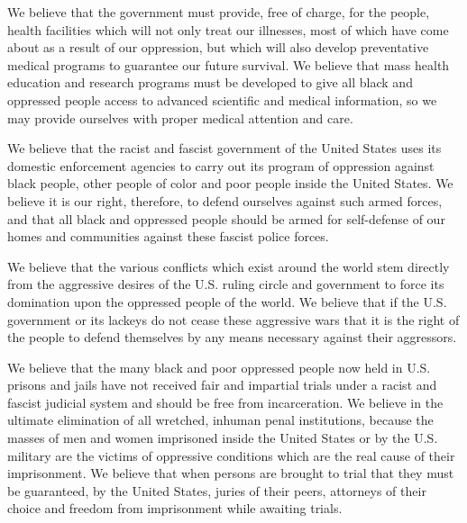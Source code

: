 \documentclass[14pt]{extarticle}
\begin{document}
 We believe that the government must provide, free of charge, for the people, health facilities which will not only treat our illnesses, most of which have come about as a result of our oppression, but which will also develop preventative medical programs to guarantee our future survival. We believe that mass health education and research programs must be developed to give all black and oppressed people access to advanced scientific and medical information, so we may provide ourselves with proper medical attention and care.

 We believe that the racist and fascist government of the United States uses its domestic enforcement agencies to carry out its program of oppression against black people, other people of color and poor people inside the United States. We believe it is our right, therefore, to defend ourselves against such armed forces, and that all black and oppressed people should be armed for self-defense of our homes and communities against these fascist police forces.

 We believe that the various conflicts which exist around the world stem directly from the aggressive desires of the U.S. ruling circle and government to force its domination upon the oppressed people of the world. We believe that if the U.S. government or its lackeys do not cease these aggressive wars that it is the right of the people to defend themselves by any means necessary against their aggressors.

 We believe that the many black and poor oppressed people now held in U.S. prisons and jails have not received fair and impartial trials under a racist and fascist judicial system and should be free from incarceration. We believe in the ultimate elimination of all wretched, inhuman penal institutions, because the masses of men and women imprisoned inside the United States or by the U.S. military are the victims of oppressive conditions which are the real cause of their imprisonment. We believe that when persons are brought to trial that they must be guaranteed, by the United States, juries of their peers, attorneys of their choice and freedom from imprisonment while awaiting trials.
\end{document}
